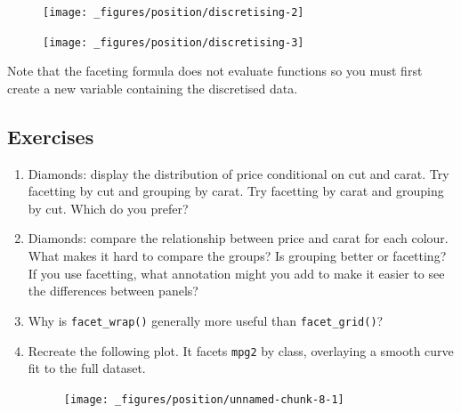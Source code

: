 \begin{figure}[H]
  \texttt{[image: \_figures/position/discretising-2]}%
\end{figure}

\begin{Shaded}
\begin{Highlighting}[]
\StringTok{ } \NormalTok{)}
\end{Highlighting}
\end{Shaded}

\begin{figure}[H]
  \texttt{[image: \_figures/position/discretising-3]}
\end{figure}

Note that the faceting formula does not evaluate functions so you must
first create a new variable containing the discretised data.

\subsection{Exercises}

\begin{enumerate}
\def\labelenumi{\arabic{enumi}.}
\item
  Diamonds: display the distribution of price conditional on cut and
  carat. Try facetting by cut and grouping by carat. Try facetting by
  carat and grouping by cut. Which do you prefer?
\item
  Diamonds: compare the relationship between price and carat for each
  colour. What makes it hard to compare the groups? Is grouping better
  or facetting? If you use facetting, what annotation might you add to
  make it easier to see the differences between panels?
\item
  Why is \texttt{facet\_wrap()} generally more useful than
  \texttt{facet\_grid()}?
\item
  Recreate the following plot. It facets \texttt{mpg2} by class,
  overlaying a smooth curve fit to the full dataset.

  \begin{figure}[H]
    \centering
    \texttt{[image: \_figures/position/unnamed-chunk-8-1]}
  \end{figure}
\end{enumerate}



